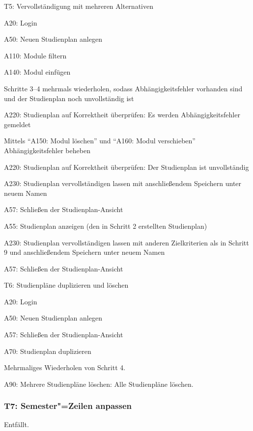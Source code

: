 \begin{scenario}{T5: Vervollständigung mit mehreren Alternativen}
	\item A20: Login
	\item A50: Neuen Studienplan anlegen
	\item A110: Module filtern
	\item A140: Modul einfügen
	\item Schritte 3–4 mehrmals wiederholen, sodass Abhängigkeitsfehler vorhanden sind und der {Studienplan} noch unvollständig ist
	\item A220: Studienplan auf Korrektheit überprüfen: Es werden Abhängigkeitsfehler gemeldet
	\item Mittels \enquote{A150: Modul löschen} und \enquote{A160: Modul verschieben} Abhängigkeitsfehler beheben
	\item A220: Studienplan auf Korrektheit überprüfen: Der Studienplan ist unvollständig
	\item A230: Studienplan vervollständigen lassen mit anschließendem Speichern unter neuem Namen
	\item A57: Schließen der Studienplan-Ansicht
	\item A55: Studienplan anzeigen (den in Schritt 2 erstellten Studienplan)
	\item A230: Studienplan vervollständigen lassen mit anderen Zielkriterien als in Schritt 9 und anschließendem Speichern unter neuem Namen
	\item A57: Schließen der Studienplan-Ansicht
\end{scenario}

\begin{scenario}{T6: Studienpläne duplizieren und löschen}
	\item A20: Login
	\item A50: Neuen Studienplan anlegen
	\item A57: Schließen der Studienplan-Ansicht
	\item A70: Studienplan duplizieren
	\item Mehrmaliges Wiederholen von Schritt 4.
	\item A90: Mehrere Studienpläne löschen: Alle Studienpläne löschen.
\end{scenario}

\subsubsection*{T7: Semester"=Zeilen anpassen}
\vspace{-\baselineskip}
Entfällt. 

